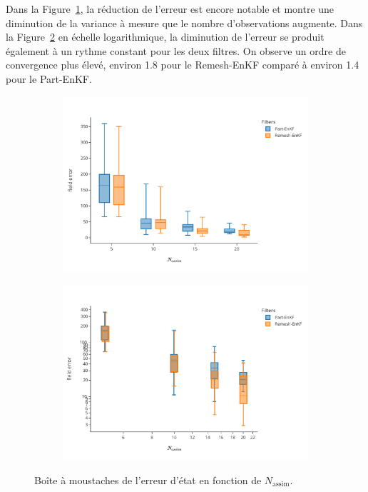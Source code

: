 Dans la Figure~\ref{fig:na_1}, la réduction de l'erreur est encore notable et montre une diminution de la variance à mesure que le nombre d'observations augmente. Dans la Figure~\ref{fig:na_2} en échelle logarithmique, la diminution de l'erreur se produit également à un rythme constant pour les deux filtres. On observe un ordre de convergence plus élevé, environ 1.8 pour le Remesh-EnKF comparé à environ 1.4 pour le Part-EnKF.

\begin{figure}[h!]
    \centering
    \begin{subfigure}{0.49\linewidth}
        \centering
        \includegraphics[width=\linewidth]{./images/app2d/final/MSE_na_box.pdf}
        \caption{}
        \label{fig:na_1}
    \end{subfigure}
    \begin{subfigure}{0.49\linewidth}
        \centering
        \includegraphics[width=\linewidth]{./images/app2d/final/MSE_na_box_log_log.pdf}
        \caption{}
        \label{fig:na_2}
    \end{subfigure}
    \caption{Boîte à moustaches de l'erreur d'état en fonction de $N_{\text{assim}}$.}
    \label{fig:na}
\end{figure}

